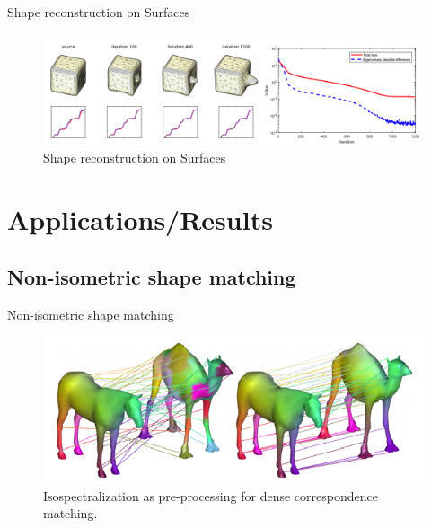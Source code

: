 \documentclass{beamer}
\begin{document}
\begin{frame}{Shape reconstruction on Surfaces}

\begin{figure}
    \centering
    \includegraphics[width=\textwidth]{Surfaces2.png}
    \caption{Shape reconstruction on Surfaces}
    \label{fig:my_label}
\end{figure}
    
\end{frame}

\section{Applications/Results}


\subsection{Non-isometric shape matching}

\begin{frame}{Non-isometric shape matching}
    
\begin{figure}
 \includegraphics[width=\textwidth]{Correspondenses.png}
 \caption{\label{fig:Correspondenses} Isospectralization as pre-processing for dense correspondence matching.}
\end{figure}
    
    
\end{frame}
\end{document}
